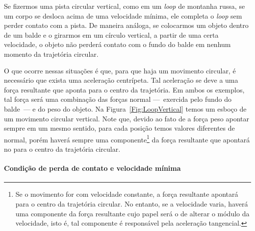 Se fizermos uma pista circular vertical, como em um \emph{loop} de montanha russa, se um corpo se desloca acima de uma velocidade mínima, ele completa o \emph{loop} sem perder contato com a pista. De maneira análoga, se colocarmos um objeto dentro de um balde e o girarmos em um círculo vertical, a partir de uma certa velocidade, o objeto não perderá contato com o fundo do balde em nenhum momento da trajetória circular.

O que ocorre nessas situações é que, para que haja um movimento circular, é necessário que exista uma aceleração centrípeta. Tal aceleração se deve a uma força resultante que aponta para o centro da trajetória. Em ambos os exemplos, tal força será uma combinação das forças normal ---~exercida pelo fundo do balde~--- e do peso do objeto. Na Figura~\ref{Fig:LoopVertical} temos um esboço de um movimento circular vertical. Note que, devido ao fato de a força peso apontar sempre em um mesmo sentido, para cada posição temos valores diferentes de normal, porém haverá sempre uma componente\footnote{Se o movimento for com velocidade constante, a força resultante apontará para o centro da trajetória circular. No entanto, se a velocidade varia, haverá uma componente da força resultante cujo papel será o de alterar o módulo da velocidade, isto é, tal componente é responsável pela aceleração tangencial.} da força resultante que apontará no para o centro da trajetória circular.

\paragraph{Condição de perda de contato e velocidade mínima}

